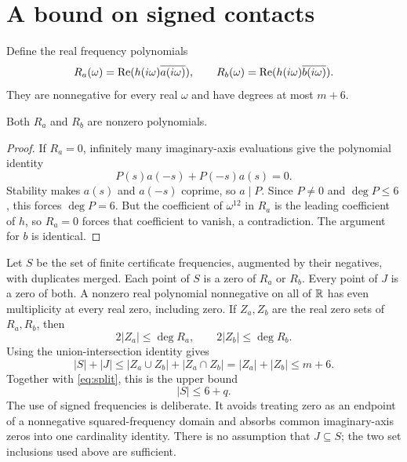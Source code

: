 \documentclass[11pt]{article}
\begin{document}
\section{A bound on signed contacts}
Define the real frequency polynomials
\[
 R_a(\omega)=\operatorname{Re}(h(i\omega)\overline{a(i\omega)}),\qquad
 R_b(\omega)=\operatorname{Re}(h(i\omega)\overline{b(i\omega)}).
\]
They are nonnegative for every real $\omega$ and have degrees at most $m+6$.

\begin{lemma}\label{lem:crossnonzero}
Both $R_a$ and $R_b$ are nonzero polynomials.
\end{lemma}
\begin{proof}
If $R_a=0$, infinitely many imaginary-axis evaluations give the polynomial identity
\[
 P(s)a(-s)+P(-s)a(s)=0.
\]
Stability makes $a(s)$ and $a(-s)$ coprime, so $a\mid P$. Since $P\ne0$ and $\deg P\le6$, this forces $\deg P=6$. But the coefficient of $\omega^{12}$ in $R_a$ is the leading coefficient of $h$, so $R_a=0$ forces that coefficient to vanish, a contradiction. The argument for $b$ is identical.
\end{proof}

Let $S$ be the set of finite certificate frequencies, augmented by their negatives, with duplicates merged. Each point of $S$ is a zero of $R_a$ or $R_b$. Every point of $J$ is a zero of both. A nonzero real polynomial nonnegative on all of $\mathbb R$ has even multiplicity at every real zero, including zero. If $Z_a,Z_b$ are the real zero sets of $R_a,R_b$, then
\[
 2|Z_a|\le\deg R_a,\qquad 2|Z_b|\le\deg R_b.
\]
Using the union-intersection identity gives
\begin{equation}\label{eq:budget}
 |S|+|J|
 \le |Z_a\cup Z_b|+|Z_a\cap Z_b|
 =|Z_a|+|Z_b|\le m+6.
\end{equation}
Together with \eqref{eq:split}, this is the upper bound
\begin{equation}\label{eq:upper}
 |S|\le6+q.
\end{equation}
The use of signed frequencies is deliberate. It avoids treating zero as an endpoint of a nonnegative squared-frequency domain and absorbs common imaginary-axis zeros into one cardinality identity. There is no assumption that $J\subseteq S$; the two set inclusions used above are sufficient.
\end{document}
